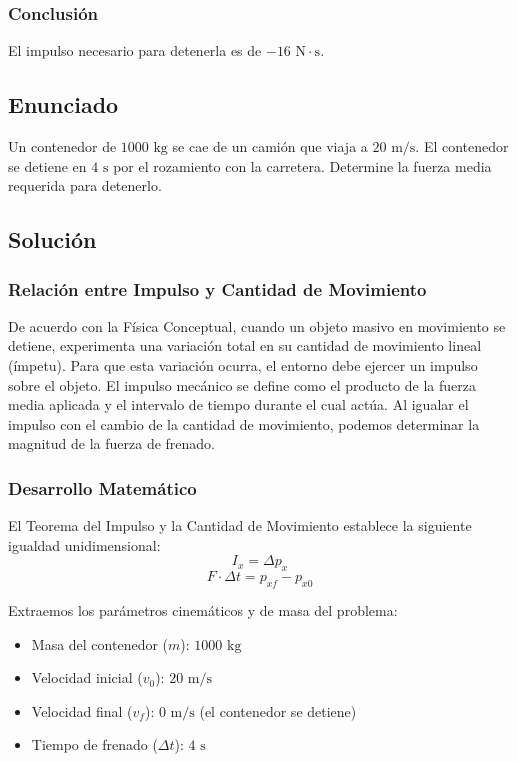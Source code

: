 \documentclass{article}
\begin{document}
\subsubsection*{Conclusión}
El impulso necesario para detenerla es de $-16 \text{ N}\cdot\text{s}$.

\newpage

\subsection*{Enunciado}
Un contenedor de $1000 \text{ kg}$ se cae de un camión que viaja a $20 \text{ m/s}$. El contenedor se detiene en $4 \text{ s}$ por el rozamiento con la carretera. Determine la fuerza media requerida para detenerlo.

\subsection*{Solución}

\subsubsection*{Relación entre Impulso y Cantidad de Movimiento}
De acuerdo con la Física Conceptual, cuando un objeto masivo en movimiento se detiene, experimenta una variación total en su cantidad de movimiento lineal (ímpetu). Para que esta variación ocurra, el entorno debe ejercer un impulso sobre el objeto. El impulso mecánico se define como el producto de la fuerza media aplicada y el intervalo de tiempo durante el cual actúa. Al igualar el impulso con el cambio de la cantidad de movimiento, podemos determinar la magnitud de la fuerza de frenado.

\subsubsection*{Desarrollo Matemático}
El Teorema del Impulso y la Cantidad de Movimiento establece la siguiente igualdad unidimensional:
$$I_x = \Delta p_x$$
$$F \cdot \Delta t = p_{xf} - p_{x0}$$

Extraemos los parámetros cinemáticos y de masa del problema:
\begin{itemize}
    \item Masa del contenedor ($m$): $1000 \text{ kg}$
    \item Velocidad inicial ($v_0$): $20 \text{ m/s}$
    \item Velocidad final ($v_f$): $0 \text{ m/s}$ (el contenedor se detiene)
    \item Tiempo de frenado ($\Delta t$): $4 \text{ s}$
\end{itemize}
\end{document}
